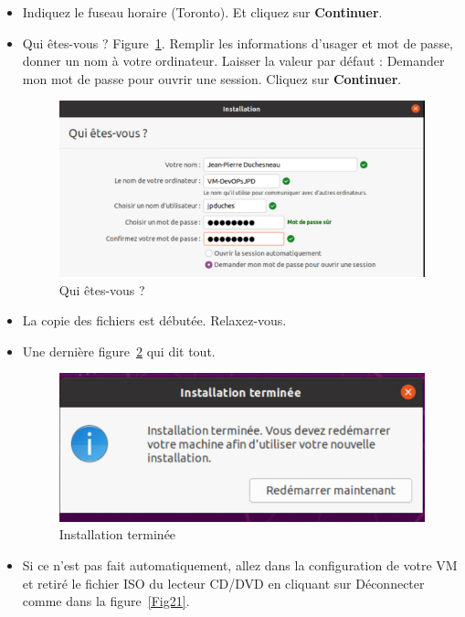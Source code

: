\begin{itemize}
		
		\item Indiquez le fuseau horaire (Toronto). Et cliquez sur \textbf{Continuer}.
		\item Qui êtes-vous ? Figure~\ref{Fig19}. Remplir les informations d'usager et mot de passe, donner un nom à votre ordinateur. Laisser la valeur par défaut : Demander mon mot de passe pour ouvrir une session. Cliquez sur \textbf{Continuer}.
		
		\begin{figure}[!htb]
			\centering
			\caption{\label{Fig19}Qui êtes-vous ?}
			\includegraphics[scale=0.55]{images/Capture21}
		\end{figure} 
		
		\item La copie des fichiers est débutée. Relaxez-vous. {\color{orange}{\Huge \smiley{}}}
		
		\item Une dernière figure~\ref{Fig20} qui dit tout.
		\begin{figure}[!htb]
			\centering
			\caption{\label{Fig20}Installation terminée}
			\includegraphics[scale=0.55]{images/Capture22}
		\end{figure} 
		
		\item Si ce n'est pas fait automatiquement, allez dans la configuration de votre VM et retiré le fichier ISO du lecteur CD/DVD en cliquant sur Déconnecter comme dans la figure~\ref{Fig21}.
		

\end{itemize}
